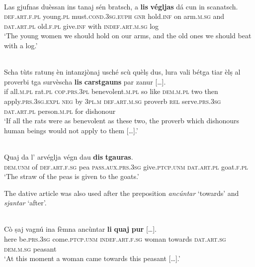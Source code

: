\ea\label{}
\\
\gll   Las gjufnas duèssan ins tanaj sén bratsch, a \textbf{lis} \textbf{végljas} dá cun in scanatsch.\\
\textsc{def.art.f.pl} young.\textsc{pl} must.\textsc{cond.3sg.euph} \textsc{gnr} hold.\textsc{inf} on arm.\textsc{m.sg} and \textsc{dat.art.pl} old.\textsc{f.pl} give.\textsc{inf} with \textsc{indef.art.m.sg} log\\
\glt `The young women we should hold on our arms, and the old ones we should beat with a log.'
\z

\ea\label{}
\\
\gll  Scha tùts ratunṣ èn intanzjònaj usché scù quèlṣ dus, lura vali bétga tiar èlṣ al proverbi tga survèscha \textbf{lis} \textbf{carstgauns} par zanur […].\\
     if all.\textsc{m.pl} rat.\textsc{pl} \textsc{cop.prs.3pl} benevolent.\textsc{m.pl} so like \textsc{dem.m.pl} two then apply.\textsc{prs.3sg.expl}  \textsc{neg}  by \textsc{3pl.m}  \textsc{def.art.m.sg} proverb \textsc{rel}  serve.\textsc{prs.3sg}  \textsc{dat.art.pl} person.\textsc{m.pl} for dishonour\\
\glt `If all the rats were as benevolent as these two, the proverb which dishonours human beings would not apply to them […].'
\z

\ea\label{}
\\
\gll Quaj da l’ arvéglja végn dau \textbf{dis} \textbf{tgauras}.  \\
\textsc{dem.unm} of \textsc{def.art.f.sg} pea \textsc{pass.aux.prs.3sg} give.\textsc{ptcp.unm} \textsc{dat.art.pl} goat.\textsc{f.pl} \\
\glt `The straw of the peas is given to the goats.'
\z

The dative article was also used after the preposition \textit{ancúntar} `towards' and \textit{sjantar} `after'.

\ea\label{}
 {\citealt[64]{Büchli1966}}\\
\gll  Cò ṣaj vagnú ina	fèmna ancùntar \textbf{li} \textbf{quaj} \textbf{pur} […].\\
here be.\textsc{prs}.3\textsc{sg}  come.\textsc{ptcp.unm}	\textsc{indef}.\textsc{art}.\textsc{f}.\textsc{sg} woman towards	\textsc{dat}.\textsc{art}.\textsc{sg} \textsc{dem.m.sg} peasant\\
\glt `At this moment a woman came towards this peasant […].'
\z

